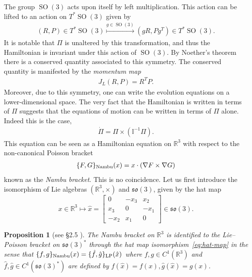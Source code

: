 \documentclass[12pt]{amsart}
\newcommand{\so}{\ensuremath{\mathfrak{so}}}
\newcommand{\R}{\ensuremath{\mathbb{R}}}
\newtheorem{prop}[thm]{Proposition}
\DeclareMathOperator{\SO}{SO}
\begin{document}
  The group $\SO(3)$ acts upon itself by left multiplication.
  This action can be lifted to an action on $T^*\SO(3)$ given by
  \begin{align*}
    (R,P) \in T^* \SO(3) \stackrel{g \in \SO(3) }{\mapsto}
    (g R , P g^T ) \in T^* \SO(3).
  \end{align*}
  It is notable that $\Pi$ is unaltered by this transformation,
  and thus the Hamiltonian is invariant under this action of $\SO(3)$.
  By Noether's theorem there is a conserved quantity associated to 
  this symmetry.
  The conserved quantity is manifested by the \emph{momentum map}
  \begin{align*}
    J_L(R,P) = R^T P .
  \end{align*}
  Moreover, due to this symmetry, one can write the evolution equations
  on a lower-dimensional space.
  The very fact that the Hamiltonian is written in terms of $\Pi$
  suggests that the equations of motion can be written in terms of $\Pi$ alone.
  Indeed this is the case,
  \begin{align}
    \dot{\Pi} = \Pi \times (\mathbb{I}^{-1} \Pi ). \label{eq:rigid_body}
  \end{align}
  This equation can be seen as a Hamiltonian equation on $\mathbb{R}^3$
  with respect to the non-canonical Poisson bracket
  \begin{align}
    \{ F , G \}_{\rm Nambu}(x)  = x \cdot (\nabla F \times \nabla G) \label{eq:Nambu}
  \end{align}
  known as the \emph{Nambu bracket}.
  This is no coincidence. Let us first introduce the isomorphism of
  Lie algebras $(\R^3,\times)$ and $\so(3)$, given by the hat map
  \begin{equation}\label{eq:hat-map}
    x \in \R^3 \mapsto
    \hat{x} = 
    \begin{bmatrix}
      0   & -x_3 &  x_2 \\
      x_3 & 0    & -x_1 \\
     -x_2 &  x_1 & 0
    \end{bmatrix} \in \so(3).
  \end{equation}
  \begin{prop}[see \S 2.5 \cite{HolmBook2}] \label{prop:Nambu}
    The Nambu bracket on $\mathbb{R}^3$
    is identified to the Lie--Poisson bracket on $\so(3)^*$
    through the hat map isomorphism~\eqref{eq:hat-map}
    in the sense that $\{ f,g\}_{\rm Nambu}( x) = \{ \hat{f} , \hat{g} \}_{\rm LP}( \hat{x})$
    where $f,g \in C^1(\mathbb{R}^3)$ and 
    $\hat{f},\hat{g} \in C^1(\so(3)^*)$ are defined by 
    $\hat{f}( \hat{x} ) = f(x), \hat{g}( \hat{x} ) = g(x)$.
  \end{prop}
\end{document}

